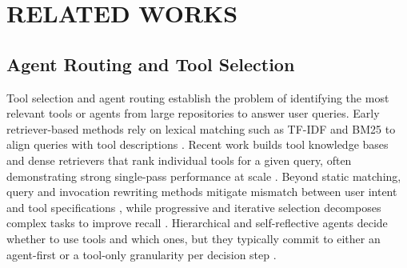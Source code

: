 \documentclass[a4paper,twoside]{article}
\begin{document}

\section{\uppercase{Related Works}}
\label{sec:related}

\subsection{Agent Routing and Tool Selection}
Tool selection and agent routing establish the problem of identifying the most relevant tools or agents from large repositories to answer user queries. Early retriever-based methods rely on lexical matching such as TF-IDF and BM25 to align queries with tool descriptions \cite{papineni_why_2001,robertson_probabilistic_2009}. Recent work builds tool knowledge bases and dense retrievers that rank individual tools for a given query, often demonstrating strong single-pass performance at scale \cite{lumer2024toolshedscaletoolequippedagents,lumer2025tooltoagentretrieval,moon_efficient_2024,li_api_bank_2023,yuan_easytool_2024}. Beyond static matching, query and invocation rewriting methods mitigate mismatch between user intent and tool specifications \cite{chen2024reinvoketoolinvocationrewriting}, while progressive and iterative selection decomposes complex tasks to improve recall \cite{anantha_protip_2023,trivedi_interleaving_2023,tang_multihop-rag_2024}. Hierarchical and self-reflective agents decide whether to use tools and which ones, but they typically commit to either an agent-first or a tool-only granularity per decision step \cite{du_anytool_2024,huang2024metatoolbenchmarklargelanguage,langgraph_multi_agent_systems_2024}.
\end{document}
